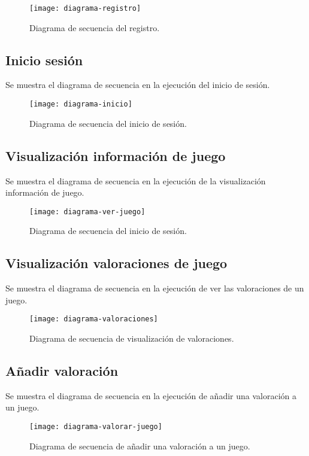 \begin{figure}[!h]
\centering
\texttt{[image: diagrama-registro]}
\caption{Diagrama de secuencia del registro.}
\label{fig:diagrama-secuencia-resgistro}
\end{figure}

\newpage
\subsection{Inicio sesión}
Se muestra el diagrama de secuencia en la ejecución del inicio de sesión.

\begin{figure}[!h]
\centering
\texttt{[image: diagrama-inicio]}
\caption{Diagrama de secuencia del inicio de sesión.}
\label{fig:diagrama-secuencia-inicio-sesion}
\end{figure}

\newpage
\subsection{Visualización información de juego}
Se muestra el diagrama de secuencia en la ejecución de la visualización información de juego.
\begin{figure}[htb]
\centering
\texttt{[image: diagrama-ver-juego]}
\caption{Diagrama de secuencia del inicio de sesión.}
\label{fig:diagrama-secuencia-información-juego}
\end{figure}

\subsection{Visualización valoraciones de juego}
Se muestra el diagrama de secuencia en la ejecución de ver las valoraciones de un juego.
\begin{figure}[htb]
\centering
\texttt{[image: diagrama-valoraciones]}
\caption{Diagrama de secuencia de visualización de valoraciones.}
\label{fig:diagrama-secuencia-ver-valoraciones}
\end{figure}

\newpage
\subsection{Añadir valoración}
Se muestra el diagrama de secuencia en la ejecución de añadir una valoración a un juego.

\begin{figure}[htb]
\centering
\texttt{[image: diagrama-valorar-juego]}
\caption{Diagrama de secuencia de añadir una valoración a un juego.}
\label{fig:diagrama-secuencia-añadir-valoración}
\end{figure}

